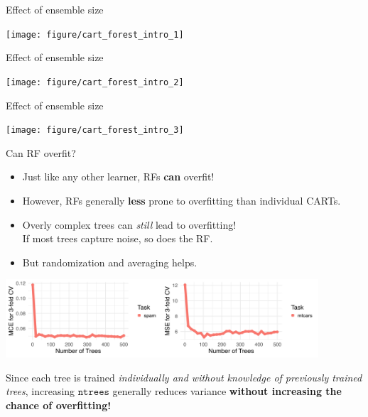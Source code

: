 \documentclass[11pt,compress,t,notes=noshow, xcolor=table]{beamer}
\begin{document}

\begin{frame2}{Effect of ensemble size}

  {\centering \texttt{[image: figure/cart\_forest\_intro\_1]}}
\end{frame2}

\begin{frame2}{Effect of ensemble size}
\addtocounter{framenumber}{-1}
{\centering \texttt{[image: figure/cart\_forest\_intro\_2]}}
\end{frame2}

\begin{frame2}{Effect of ensemble size}
\addtocounter{framenumber}{-1}
{\centering \texttt{[image: figure/cart\_forest\_intro\_3]}}
\end{frame2}

\begin{frame2}{Can RF overfit? }

{\small
\begin{itemize}
  \item Just like any other learner, RFs \textbf{can} overfit!\\
  \item However, RFs generally \textbf{less} prone to overfitting than individual CARTs.
  \item Overly complex trees can \textit{still} lead to overfitting!\\
    If most trees capture noise, so does the RF.
  \item But randomization and averaging helps.
\end{itemize}

\begin{center}
\includegraphics[width=330pt]{figure/forest-ntree.png}
\end{center}


Since each tree is trained \textit{individually and without knowledge of previously trained trees}, increasing $\texttt{ntrees}$ generally reduces variance \textbf{without increasing the chance of overfitting!}
}
\end{frame2}
\end{document}
